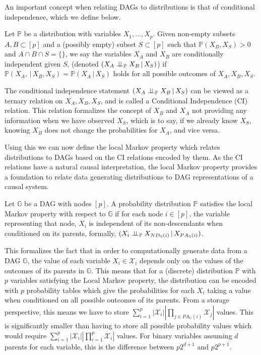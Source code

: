 \documentclass{tufte-book}
\begin{document}
An important concept when relating DAGs to distributions is that of conditional independence, which we define below.
\begin{definition}\label{def:cirel}
Let  $\mathbb{P}$ be a distribution with variables $X_1,...,X_p$. Given non-empty subsets $A,B \subset [p]$ and a (possibly empty) subset $S \subset [p]$ such that $\mathbb{P}(X_B, X_S)>0$ and $A \cap B \cap S = \{\}$, we say the variables $X_A$ and $X_B$ are conditionally independent given $S$, (denoted $(X_A\perp \!\!\! \perp_{\mathbb{P}} X_B \,|\, X_S)$) if $\mathbb{P}(X_A, \,|\,X_B, X_S) = \mathbb{P}(X_A \, |\, X_S)$ holds for all possible outcomes of $X_A,X_B,X_S$.
\end{definition}

The conditional independence statement \((X_A \perp \!\!\! \perp_{\mathbb{P}} X_B \,|\,X_S)\) can be viewed as a ternary relation on \(X_A,X_B,X_S\), and is called a Conditional Independence (CI) relation. This relation formalizes the concept of \(X_B\) and \(X_A\) not providing any information when we have observed \(X_S\), which is to say, if we already know \(X_S\), knowing \(X_B\) does not change the probabilities for \(X_A\), and vice versa.


Using this we can now define the local Markov property which relates distributions to DAGs based on the CI relations encoded by them. As the CI relations have a natural causal interpretation, the local Markov property provides a foundation to relate data generating distributions to DAG representations of a causal system.


\begin{definition}\label{thm:localmarkovdag}
Let $\mathbb{G}$ be a DAG with nodes $[p]$. A probability distribution $\mathbb{P}$ satisfies the local Markov property with respect to $\mathbb{G}$ if for each node $i \in [p]$, the variable representing that node, $X_i$ is independent of its non-descendants when conditioned on its parents, formally, $(X_i \perp \!\!\! \perp_{\mathbb{P}} X_{ND_{\mathbb{G}}(i)}\,|\,X_{PA_{\mathbb{G}}(i)})$.
\end{definition}

This formalizes the fact that in order to computationally generate data from a DAG \(\mathbb{G}\), the value of each variable \(X_i \in \mathcal{X}_i\) depends only on the values of the outcomes of its parents in \(\mathbb{G}\). This means that for a (discrete) distribution \(\mathbb{P}\) with \(p\) variables satisfying the Local Markov property, the distribution can be encoded with \(p\) probability tables which give the probabilities for each \(X_i\) taking a value when conditioned on all possible outcomes of its parents. From a storage perspective, this means we have to store \(\sum_{i=1}^p |\mathcal{X}_i| |\prod_{j \in PA_{\mathbb{G}}(i)}\mathcal{X}_j |\) values. This is significantly smaller than having to store all possible probability values which would require  \(\sum_{i=1}^p |\mathcal{X}_i||\prod_{i=1}^p \mathcal{X}_i|\) values. For binary variables assuming \(d\) parents for each variable, this is the difference between \(p2^{d+1}\) and \(p2^{p+1}\).
\end{document}
